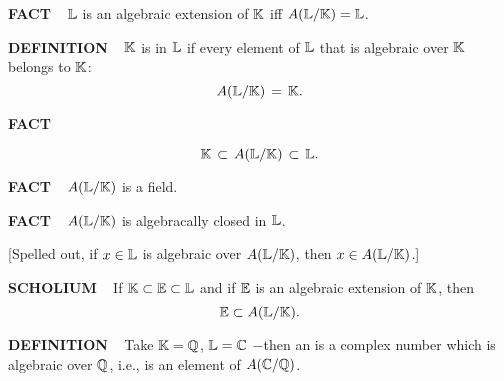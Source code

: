 \vspace{0.1cm}

\begin{x}{\small\bf FACT} \ %
$\mathbb{L}$ is an algebraic extension of $\mathbb{K}$ iff $A(\mathbb{L}/\mathbb{K}) = \mathbb{L}$.
\end{x}

\vspace{0.1cm}

\begin{x}{\small\bf DEFINITION}  \ %
$\mathbb{K}$ is 
in $\mathbb{L}$ if every element of $\mathbb{L}$ that is algebraic over $\mathbb{K}$ belongs to $\mathbb{K}$:
\[
A(\mathbb{L}/\mathbb{K}) \hspace{0.05cm} = \hspace{0.05cm} \mathbb{K}.
\]
\end{x}

\vspace{0.1cm}

\begin{x}{\small\bf FACT} \ %

\[
\mathbb{K} \hspace{0.05cm} \subset\hspace{0.05cm} A(\mathbb{L}/\mathbb{K}) \hspace{0.05cm}\subset\hspace{0.05cm} \mathbb{L}.
\]
\end{x}

\vspace{0.1cm}

\begin{x}{\small\bf FACT}  \ %
$A(\mathbb{L}/\mathbb{K})$ is a field.
\end{x}

\vspace{0.1cm}

\begin{x}{\small\bf FACT}  \ %
$A(\mathbb{L}/\mathbb{K})$ is algebracally closed in $\mathbb{L}$.

\vspace{0.1cm}

[Spelled out, if $x \in \mathbb{L}$ is algebraic over $A(\mathbb{L}/\mathbb{K})$, then $x \in A(\mathbb{L}/\mathbb{K})$.]
\end{x}

\vspace{0.1cm}

\begin{x}{\small\bf SCHOLIUM} \ %
If $\mathbb{K} \subset \mathbb{E} \subset \mathbb{L}$ and if $\mathbb{E}$ is an algebraic extension of $\mathbb{K}$, then
\[
\mathbb{E} \subset A(\mathbb{L}/\mathbb{K}).
\]
\end{x}


\vspace{0.1cm}

\begin{x}{\small\bf DEFINITION} \ %
Take $\mathbb{K} = \mathbb{Q}$, $\mathbb{L} = \mathbb{C}$ $-$then an 
is a complex number which is algebraic over $\mathbb{Q}$, i.e., is an element of $A(\mathbb{C}/\mathbb{Q})$.
\end{x}

